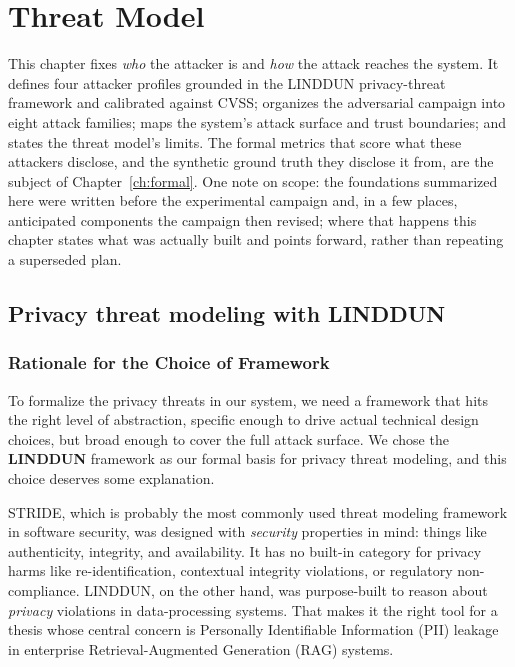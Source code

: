 \documentclass[12pt,a4paper]{report}
\begin{document}
\chapter{Threat Model}
\label{ch:threat}

This chapter fixes \emph{who} the attacker is and \emph{how} the attack reaches the system. It
defines four attacker profiles grounded in the LINDDUN privacy-threat framework and calibrated
against CVSS; organizes the adversarial campaign into eight attack families; maps the system's
attack surface and trust boundaries; and states the threat model's limits. The formal metrics
that score what these attackers disclose, and the synthetic ground truth they disclose it from,
are the subject of Chapter~\ref{ch:formal}. One note on scope: the foundations summarized here
were written before the experimental campaign and, in a few places, anticipated components the
campaign then revised; where that happens this chapter states what was actually built and points
forward, rather than repeating a superseded plan.

\section{Privacy threat modeling with LINDDUN}
\label{sec:ch3-linddun}

\subsection{Rationale for the Choice of Framework}

To formalize the privacy threats in our system, we need a framework that
hits the right level of abstraction, specific enough to drive actual
technical design choices, but broad enough to cover the full attack surface.
We chose the \textbf{LINDDUN} framework as our formal basis for privacy
threat modeling, and this choice deserves some explanation.

STRIDE, which is probably the most commonly used threat modeling framework
in software security, was designed with \emph{security} properties in
mind: things like authenticity, integrity, and availability. It has no
built-in category for privacy harms like re-identification, contextual
integrity violations, or regulatory non-compliance.
LINDDUN, on the other hand, was purpose-built to reason about
\emph{privacy} violations in data-processing systems. That makes it the
right tool for a thesis whose central concern is Personally Identifiable
Information (PII) leakage in enterprise Retrieval-Augmented Generation
(RAG) systems.
\end{document}
